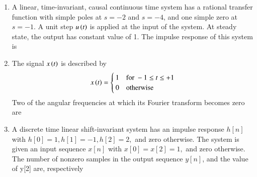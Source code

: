 \documentclass[a4paper, 11pt]{article}
\begin{document}
\begin{enumerate}
    \hfill{}
    
    \item A linear, time-invariant, causal continuous time system has a rational transfer function with simple poles at $s=-2$ and $s=-4$, and one simple zero at $s=-1$. A unit step $u\left(t\right)$ is applied at the input of the system. At steady state, the output has constant value of 1. The impulse response of this system is
    
    \begin{enumerate}
    \end{enumerate}
    
    \hfill{}
    
    \item The signal $x\left(t\right)$ is described by
    \[ x\left(t\right) = \begin{cases} 1 & \text{for } -1 \le t \le +1 \\ 0 & \text{otherwise} \end{cases} \]
    Two of the angular frequencies at which its Fourier transform becomes zero are
    
    \begin{enumerate}
    \end{enumerate}
    
    \hfill{}
    
    \item A discrete time linear shift-invariant system has an impulse response $h[n]$ with $h[0]=1, h[1]=-1, h[2]=2,$ and zero otherwise. The system is given an input sequence $x[n]$ with $x[0]=x[2]=1,$ and zero otherwise. The number of nonzero samples in the output sequence $y[n]$, and the value of y[2] are, respectively
    

\end{enumerate}
\end{document}
